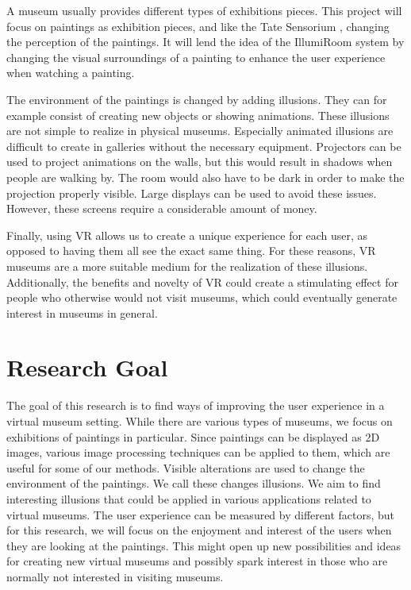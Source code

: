 \documentclass[a4paper]{article}
\begin{document}
A museum usually provides different types of exhibitions pieces. This project will focus on paintings as exhibition pieces, and like the Tate Sensorium \cite{tate2}, changing the perception of the paintings. It will lend the idea of the IllumiRoom system \cite{illumiroom} by changing the visual surroundings of a painting to enhance the user experience when watching a painting. 

The environment of the paintings is changed by adding illusions. They can for example consist of creating new objects or showing animations. These illusions are not simple to realize in physical museums. Especially animated illusions are difficult to create in galleries without the necessary equipment. Projectors can be used to project animations on the walls, but this would result in shadows when people are walking by. The room would also have to be dark in order to make the projection properly visible. Large displays can be used to avoid these issues. However, these screens require a considerable amount of money. 

Finally, using VR allows us to create a unique experience for each user, as opposed to having them all see the exact same thing. For these reasons, VR museums are a more suitable medium for the realization of these illusions. Additionally, the benefits and novelty of VR could create a stimulating effect for people who otherwise would not visit museums, which could eventually generate interest in museums in general.



\section{Research Goal}
The goal of this research is to find ways of improving the user experience in a virtual museum setting. While there are various types of museums, we focus on exhibitions of paintings in particular. Since paintings can be displayed as 2D images, various image processing techniques can be applied to them, which are useful for some of our methods. Visible alterations are used to change the environment of the paintings. We call these changes illusions. We aim to find interesting illusions that could be applied in various applications related to virtual museums. The user experience can be measured by different factors, but for this research, we will focus on the enjoyment and interest of the users when they are looking at the paintings. This might open up new possibilities and ideas for creating new virtual museums and possibly spark interest in those who are normally not interested in visiting museums.
\end{document}
